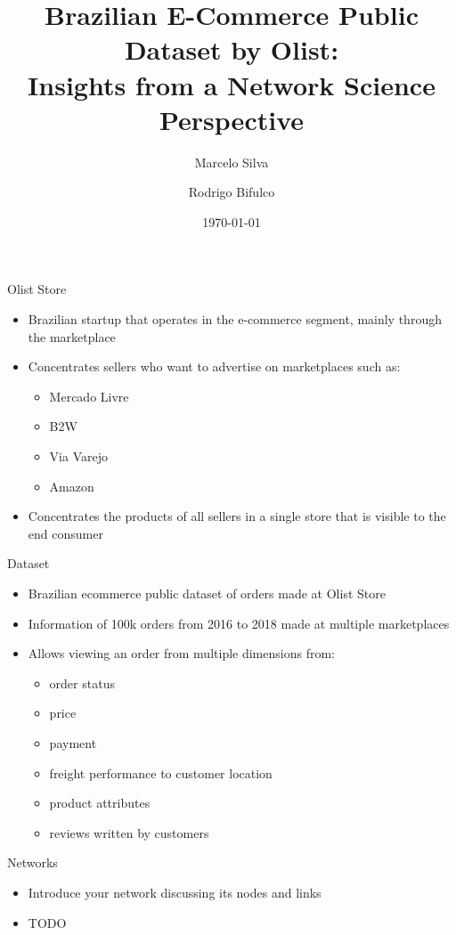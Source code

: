 \documentclass[aspectratio=169]{beamer}
\title{Brazilian E-Commerce Public Dataset by Olist: \\
    Insights from a Network Science Perspective}
\author{Marcelo Silva \and Rodrigo Bifulco}
\institute{University of Campinas}
\date{\today}
\begin{document}
\begin{frame}
\titlepage
\end{frame}

\begin{frame}{Olist Store}
\begin{itemize}
    \item Brazilian startup that operates in the e-commerce segment, mainly
            through the marketplace \cite{olist-wiki}
    \item Concentrates sellers who want to advertise on marketplaces such as:
    \begin{itemize}
        \item Mercado Livre
        \item B2W
        \item Via Varejo
        \item Amazon
    \end{itemize}
    \item Concentrates the products of all sellers in a single store that is
            visible to the end consumer
\end{itemize}
\end{frame}

\begin{frame}{Dataset}
\begin{itemize}
    \item Brazilian ecommerce public dataset of orders made at Olist Store
        \cite{olist-sionek}
    \item Information of 100k orders from 2016 to 2018 made at multiple
            marketplaces
    \item Allows viewing an order from multiple dimensions from: 
    \begin{itemize}
        \item order status
        \item price
        \item payment
        \item freight performance to customer location
        \item product attributes 
        \item reviews written by customers
    \end{itemize}
\end{itemize}
\end{frame}

\begin{frame}{Networks}
\begin{itemize}
    \item Introduce your network discussing its nodes and links
    \item \alert{TODO}
\end{itemize}
\end{frame}
\end{document}
